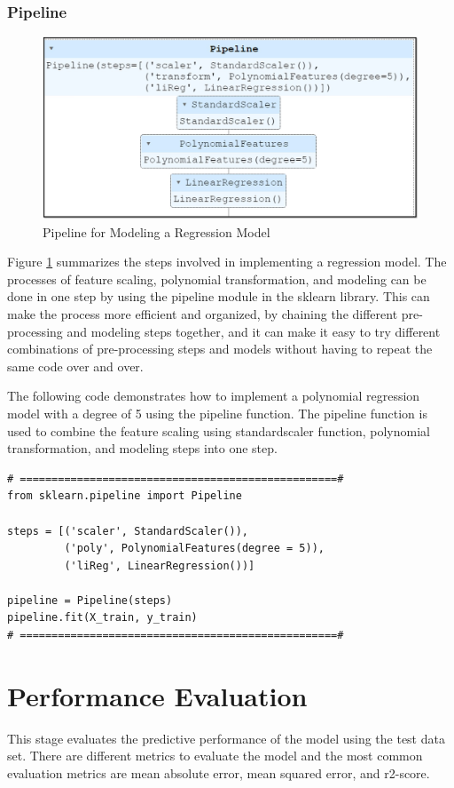 {\subsubsection{\textbf{Pipeline}}
\begin{figure}[!h]
  \centering
  \includegraphics[width=8 cm]{pipeline.jpg}
  \caption{Pipeline for Modeling a Regression Model}
  \label{fig:pipeline}
\end{figure}

Figure \ref{fig:pipeline} summarizes the steps involved in implementing a regression model. The processes of feature scaling, polynomial transformation, and modeling can be done in one step by using the pipeline module in the sklearn library. This can make the process more efficient and organized, by chaining the different pre-processing and modeling steps together, and it can make it easy to try different combinations of pre-processing steps and models without having to repeat the same code over and over.

The following code demonstrates how to implement a polynomial regression model with a degree of 5 using the pipeline function. The pipeline function is used to combine the feature scaling using standardscaler function, polynomial transformation, and modeling steps into one step.

\begin{lstlisting}
# ==================================================#
from sklearn.pipeline import Pipeline

steps = [('scaler', StandardScaler()),
         ('poly', PolynomialFeatures(degree = 5)),
         ('liReg', LinearRegression())]

pipeline = Pipeline(steps)
pipeline.fit(X_train, y_train)
# ==================================================#
\end{lstlisting}

\newpage
\section{Performance Evaluation} \label{sec:evaluate}
This stage evaluates the predictive performance of the model using the test data set. There are different metrics to evaluate the model and the most common evaluation metrics are mean absolute error, mean squared error, and r2-score.

}
